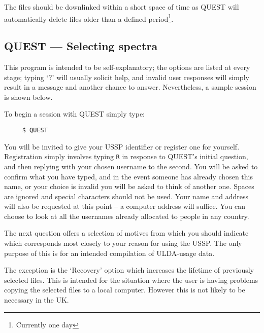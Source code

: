 The files should be downlinked within a short space of time
as QUEST will automatically delete files older than a defined 
period\footnote{Currently one day}.

\subsection{QUEST --- Selecting spectra}

This program is intended to be self-explanatory; the options are listed
at every stage; typing `?' will usually solicit help, and invalid user
responses will simply result in a message and another chance to answer.
Nevertheless, a sample session is shown  below.

To begin a session with QUEST simply type:
\begin{verbatim}
     $ QUEST
\end{verbatim}
You will be invited to give your USSP identifier or register one for yourself.
Registration simply involves typing {\tt R} in response to QUEST's initial
question, and then replying with your chosen username to the second.
You will be asked to confirm what you have typed, and in the event someone has 
already chosen this name, or your choice is invalid you will be asked to think 
of another one. Spaces are ignored and special characters should not be used.
Your  name and address will also be requested at this point -- a computer 
address will suffice.
You can choose to look at all the usernames already allocated to
people in any country.


The next question offers a selection of motives from which you should
indicate which corresponds most closely to your reason
for using the USSP.
The only purpose of this is for an intended compilation of ULDA-usage data.

The exception is the `Recovery' option which
increases the lifetime of previously selected files.
This is intended for the situation where the user is having problems copying 
the selected files to a local computer. 
However this is not likely to be necessary in the UK.
 
